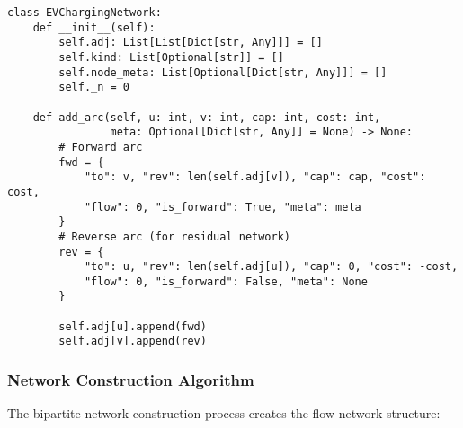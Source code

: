\documentclass[12pt,a4paper]{article}
\begin{document}
\begin{lstlisting}[caption=Residual Network Implementation]
class EVChargingNetwork:
    def __init__(self):
        self.adj: List[List[Dict[str, Any]]] = []
        self.kind: List[Optional[str]] = []
        self.node_meta: List[Optional[Dict[str, Any]]] = []
        self._n = 0
    
    def add_arc(self, u: int, v: int, cap: int, cost: int, 
                meta: Optional[Dict[str, Any]] = None) -> None:
        # Forward arc
        fwd = {
            "to": v, "rev": len(self.adj[v]), "cap": cap, "cost": cost,
            "flow": 0, "is_forward": True, "meta": meta
        }
        # Reverse arc (for residual network)
        rev = {
            "to": u, "rev": len(self.adj[u]), "cap": 0, "cost": -cost,
            "flow": 0, "is_forward": False, "meta": None
        }
        
        self.adj[u].append(fwd)
        self.adj[v].append(rev)
\end{lstlisting}

\subsubsection{Network Construction Algorithm}

The bipartite network construction process creates the flow network structure:
\end{document}
